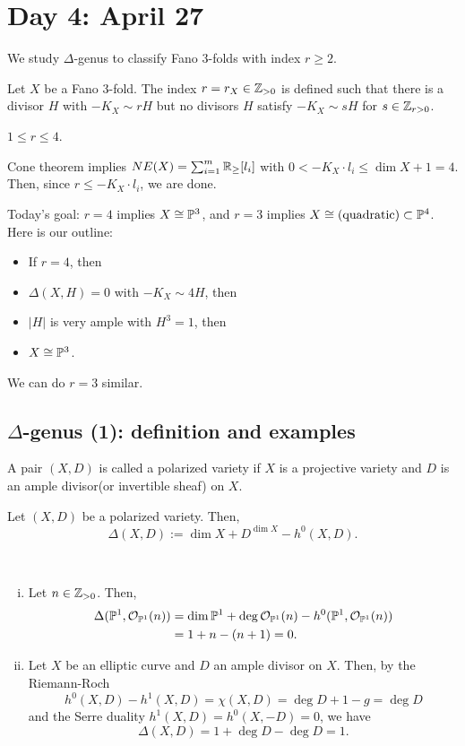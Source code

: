 \documentclass{../../small}
\begin{document}
\newpage
\section{Day 4: April 27}

We study $\Delta$-genus to classify Fano 3-folds with index $r\ge2$.

\begin{defn}
Let $X$ be a Fano 3-fold.
The index $r=r_X\in\Z_{>0}$ is defined such that there is a divisor $H$ with $-K_X\sim rH$ but no divisors $H$ satisfy $-K_X\sim sH$ for $s\in\Z_{r>0}$.
\end{defn}
\begin{lem}
$1\le r\le 4$.
\end{lem}
\begin{pf}
Cone theorem implies $NE(X)=\sum_{i=1}^m\R_{\ge}[l_i]$
with $0<-K_X\cdot l_i\le\dim X+1=4$.
Then, since $r\le-K_X\cdot l_i$, we are done.
\end{pf}

Today's goal: $r=4$ implies $X\cong\P^3$, and $r=3$ implies $X\cong\text{(quadratic)}\subset\P^4$.
Here is our outline:
\begin{itemize}
\item If $r=4$, then
\item $\Delta(X,H)=0$ with $-K_X\sim4H$, then
\item $|H|$ is very ample with $H^3=1$, then
\item $X\cong\P^3$.
\end{itemize}
We can do $r=3$ similar.

\subsection*{$\Delta$-genus (1): definition and examples}
\begin{defn}
A pair $(X,D)$ is called a polarized variety if $X$ is a projective variety and $D$ is an ample divisor(or invertible sheaf) on $X$.
\end{defn}
\begin{defn}
Let $(X,D)$ be a polarized variety.
Then,
\[\Delta(X,D):=\dim X+D^{\dim X}-h^0(X,D).\]
\end{defn}
\begin{ex}\,
\begin{enumerate}[(i)]
\item
Let $n\in\Z_{>0}$.
Then,
\begin{align*}
\Delta(\P^1,\cO_{\P^1}(n))&=\dim\P^1+\deg\cO_{\P^1}(n)-h^0(\P^1,\cO_{\P^1}(n))\\&=1+n-(n+1)=0.\end{align*}
\item
Let $X$ be an elliptic curve and $D$ an ample divisor on $X$.
Then, by the Riemann-Roch
\[h^0(X,D)-h^1(X,D)=\chi(X,D)=\deg D+1-g=\deg D\]
and the Serre duality $h^1(X,D)=h^0(X,-D)=0$, we have
\[\Delta(X,D)=1+\deg D-\deg D=1.\]
\end{enumerate}
\end{ex}
\end{document}
